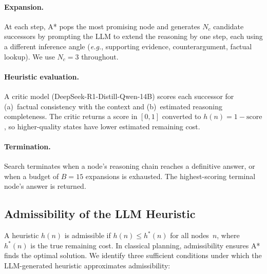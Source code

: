 \documentclass[11pt]{article}
\newcommand{\eg}{\emph{e.g.},\xspace}
\begin{document}
\paragraph{Expansion.}
At each step, A* pops the most promising node and generates $N_c$ candidate successors by prompting the LLM to extend the reasoning by one step, each using a different inference angle (\eg supporting evidence, counterargument, factual lookup). We use $N_c = 3$ throughout.

\paragraph{Heuristic evaluation.}
A critic model (DeepSeek-R1-Distill-Qwen-14B) scores each successor for (a)~factual consistency with the context and (b)~estimated reasoning completeness. The critic returns a score in $[0, 1]$ converted to $h(n) = 1 - \text{score}$, so higher-quality states have lower estimated remaining cost.

\paragraph{Termination.}
Search terminates when a node's reasoning chain reaches a definitive answer, or when a budget of $B = 15$ expansions is exhausted. The highest-scoring terminal node's answer is returned.

\subsection{Admissibility of the LLM Heuristic}
\label{sec:admissibility}

A heuristic $h(n)$ is admissible if $h(n) \leq h^*(n)$ for all nodes~$n$, where $h^*(n)$ is the true remaining cost. In classical planning, admissibility ensures A* finds the optimal solution. We identify three sufficient conditions under which the LLM-generated heuristic approximates admissibility:
\end{document}

